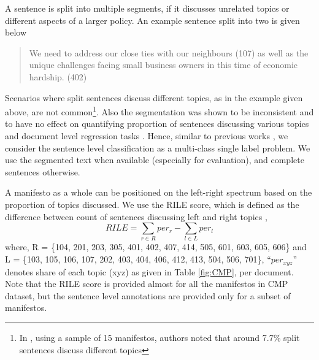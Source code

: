 \documentclass[11pt,a4paper]{article}
\begin{document}
A sentence is split into multiple segments, if it discusses unrelated topics or different aspects of a larger policy. An example sentence split into two is given below
\begin{quote}
\color{red}
We need to address our close ties with our neighbours (107) \color{blue} as well as the unique challenges facing small business owners in this time of economic hardship. (402)
\end{quote}
Scenarios where split sentences discuss different topics, as in the example given above, are not common\footnote{In \cite{daubler2012natural}, using a sample of 15 manifestos, authors noted that around 7.7\% split sentences discuss different topics}. Also the segmentation was shown to be inconsistent and to have no effect on quantifying proportion of sentences discussing various topics and document level regression tasks \cite{daubler2012natural}. Hence, similar to previous works \cite{biessmann2016automating, W17-2906}, we consider the sentence level classification as a multi-class single label problem. We use the segmented text when available (especially for evaluation), and complete sentences otherwise.

A manifesto as a whole can be positioned on the left-right spectrum based on the proportion of topics discussed. We use the RILE score, which is defined as the difference between count of sentences discussing left and right topics \cite{cat}, 
\begin{equation}
RILE = \sum_{r \in R} per_{r} - \sum_{l \in L} per_{l}
\end{equation}
where, R = \{104, 201, 203, 305, 401, 402, 407, 414, 505, 601, 603, 605, 606\} and L = \{103, 105, 106, 107, 202, 403, 404, 406, 412, 413, 504, 506, 701\}, ``$per_{xyz}$'' denotes share of each topic (xyz) as given in Table \ref{fig:CMP}, per document.  Note that the RILE score is provided almost for all the manifestos in CMP dataset, but the sentence level annotations are provided only for a subset of manifestos. 
\end{document}
